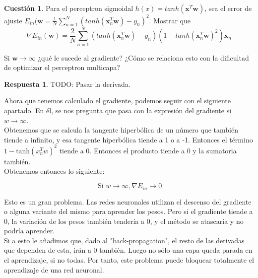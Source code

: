\documentclass[10pt,a4paper]{article}
\theoremstyle{definition}
\newtheorem{cuestion}{Cuestión}
\newtheorem*{respuesta}{Respuesta}
\begin{document}
\begin{cuestion}
Para el perceptron sigmoidal $h(x) = tanh(\mathbf{x}^T\mathbf{w})$, sea el error de ajuste $E_{in}(\mathbf{w} = \frac{1}{N} \sum_{n=1}^N (tanh(\mathbf{x}_n^T\mathbf{w}) - y_n)^2$. Mostrar que
\[ \nabla E_{in}(\mathbf{w}) = \frac{2}{N} \sum_{n=1}^N (tanh(\mathbf{x}_n^T \mathbf{w}) -y_n) (1-tanh(\mathbf{x}_n^T \mathbf{w})^2)\mathbf{x}_n	\]

Si $\mathbf{w} \rightarrow \infty$ ¿qué le sucede al gradiente? ¿Cómo se relaciona esto con la dificultad de optimizar el perceptron multicapa?\\
\end{cuestion}
\begin{respuesta}
TODO: Pasar la derivada.

Ahora que tenemos calculado el gradiente, podemos seguir con el siguiente apartado. En él, se nos pregunta que pasa con la expresión del gradiente si $w \rightarrow \infty$.\\

Obtenemos que se calcula la tangente hiperbólica de un número que también tiende a infinito, y esa tangente hiperbólica tiende a 1 o a -1. Entonces el término $1-\textrm{tanh}(x_n^Tw)^2$ tiende a 0. Entonces el producto tiende a 0 y la sumatoria también.\\
 
Obtenemos entonces lo siguiente:

\[
\ \textrm{Si }w \rightarrow \infty ,  \nabla E_{in} \rightarrow 0
\]

Esto es un gran problema. Las redes neuronales utilizan el descenso del gradiente o alguna variante del mismo para aprender los pesos. Pero si el gradiente tiende a 0, la variación de los pesos también tendería a 0, y el método se atascaría y no podría aprender.\\

Si a esto le añadimos que, dado al "back-propagation", el resto de las derivadas que dependen de esta, irán a 0 también. Luego no sólo una capa queda parada en el aprendizaje, si no todas. Por tanto, este problema puede bloquear totalmente el aprendizaje de una red neuronal.

\end{respuesta}
\end{document}
